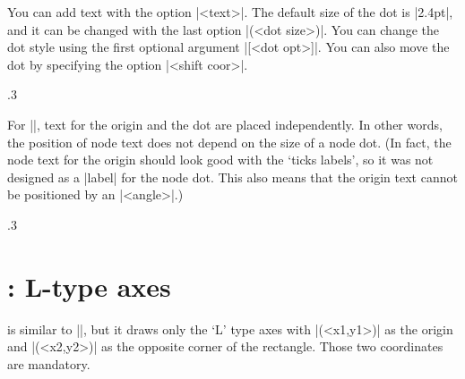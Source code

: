 You can add text with the option |{<text>}|.
The default size of the dot is |2.4pt|, and it can be changed with the last option |(<dot size>)|. You can change the dot style using the first optional argument |[<dot opt>]|.
You can also move the dot by specifying the option |<shift coor>|.

\begin{tzcode}{.3}
{}
\end{tzcode}

\remark
For |\tzshoworigin*|, text for the origin and the dot are placed independently. In other words, the position of node text does not depend on the size of a node dot.
(In fact, the node text for the origin should look good with the `ticks labels', so it was not designed as a |label| for the node dot. This also means that the origin text cannot be positioned by an |<angle>|.)


\begin{tzcode}{.3}
\end{tzcode}



\section{\protect{}: L-type axes}
\label{s:tzaxesL}

\icmd{\tzaxesL} is similar to |\tzaxes|, but it draws only the `L' type axes with |(<x1,y1>)| as the origin and |(<x2,y2>)| as the opposite corner of the rectangle. 
Those two coordinates are mandatory.


